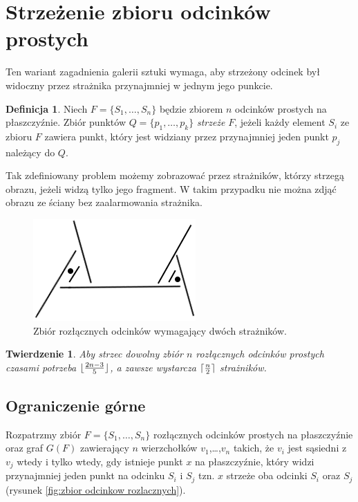\documentclass[brudnopis]{xmgr}
\DeclarePairedDelimiter\ceil{\lceil}{\rceil}
\DeclarePairedDelimiter\floor{\lfloor}{\rfloor}
\newtheorem{Twierdzenie}{Twierdzenie}
\theoremstyle{definition}
\newtheorem{Definicja}{Definicja}
\begin{document}
\section{Strzeżenie zbioru odcinków prostych}\label{sec:strzezenie odcinkow}
Ten wariant zagadnienia galerii sztuki wymaga, aby strzeżony odcinek był widoczny przez strażnika przynajmniej w jednym jego punkcie. 
\begin{Definicja}
Niech $F = \{S_1,\ldots,S_n\}$ będzie zbiorem $n$ odcinków prostych na płaszczyźnie. Zbiór punktów $Q = \{p_1,\ldots,p_k\}$ \emph{strzeże} $F$, jeżeli każdy element $S_i$ ze zbioru $F$ zawiera punkt, który jest widziany przez przynajmniej jeden punkt $p_j$ należący do $Q$.
\end{Definicja}
Tak zdefiniowany problem możemy zobrazować przez strażników, którzy strzegą obrazu, jeżeli widzą tylko jego fragment. W takim przypadku nie można zdjąć obrazu ze ściany bez zaalarmowania strażnika.
\begin{figure}[ht!]
 \centering
  \includegraphics{rysunki/rozlaczny_dwoch_straznikow.png}
  \caption{Zbiór rozłącznych odcinków wymagający dwóch strażników.}
\end{figure} 

\begin{Twierdzenie} \label{straznicy strzezenie} \cite{illumination}
Aby strzec dowolny zbiór $n$ rozłącznych odcinków prostych czasami potrzeba $\floor{\frac{2n-3}{5}}$, a zawsze wystarcza $\ceil{\frac{n}{2}}$ strażników.
\end{Twierdzenie}

\subsection{Ograniczenie górne}
Rozpatrzmy zbiór $F =\{S_1,\ldots,S_n\}$ rozłącznych odcinków prostych na płaszczyźnie oraz graf $G(F)$ zawierający $n$ wierzchołków $v_1$,\ldots,$v_n$ takich, że $v_i$ jest sąsiedni z $v_j$ wtedy i tylko wtedy, gdy istnieje punkt $x$ na płaszczyźnie, który widzi przynajmniej jeden punkt na odcinku $S_i$ i $S_j$ tzn. $x$ strzeże oba odcinki $S_i$ oraz $S_j$ (rysunek \ref{fig:zbior odcinkow rozlacznych}).
\end{document}
